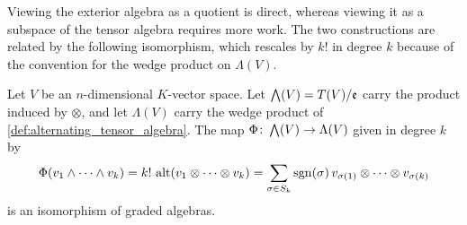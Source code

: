 \documentclass[a4paper,12pt]{article}
\begin{document}
Viewing the exterior algebra as a quotient is direct, whereas viewing it as a subspace of the tensor algebra requires more work.
The two constructions are related by the following isomorphism, which rescales by $k!$ in degree $k$ because of the convention for the wedge product on $\Lambda(V)$.
\begin{proposition}\label{prop:exterior_algebra_quotient_subspace_equivalence}
    Let $V$ be an $n$-dimensional $K$-vector space.
    Let $\extp(V) = T(V) / \mathfrak{e}$ carry the product induced by $\otimes$, and let $\Lambda(V)$ carry the wedge product of \cref{def:alternating_tensor_algebra}.
    The map $\Phi \colon \extp(V) \to \Lambda(V)$ given in degree $k$ by
    \begin{equation}
        \Phi(v_1 \wedge \cdots \wedge v_k) = k! \, \operatorname{alt}(v_1 \otimes \cdots \otimes v_k) = \sum_{\sigma \in S_k} \operatorname{sgn}(\sigma) \, v_{\sigma(1)} \otimes \cdots \otimes v_{\sigma(k)}
    \end{equation}
    is an isomorphism of graded algebras.
\end{proposition}
\end{document}
